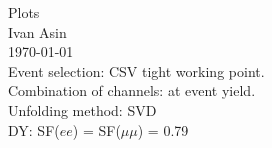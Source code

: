 \documentclass[12pt, a4paper, titlepage]{article}
\author{Ivan Asin}
\date{\today}
\begin{document}
\begin{titlepage}
\begin{center}
\LARGE{Plots}\\
\large{Ivan Asin}\\
\today\\
\vspace{3cm}
Event selection: CSV tight working point.\\
Combination of channels: at event yield.\\
Unfolding method: SVD\\
DY: SF($ee$) = SF($\mu\mu$) = 0.79
\end{center}
\end{titlepage}



\clearpage
\newpage
% 
% 
% 
% 
% 


\clearpage
\newpage


\end{document}
